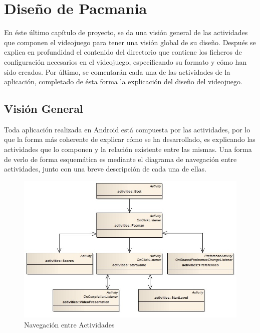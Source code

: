 \chapter{Diseño de Pacmania}

En éste último capítulo de proyecto, se da una visión general de las actividades que componen el videojuego para tener una visión global de su diseño. Después se explica en profundidad el contenido del directorio que contiene los ficheros de configuración necesarios en el videojuego, especificando su formato y cómo han sido creados. Por último, se comentarán cada una de las actividades de la aplicación, completado de ésta forma la explicación del diseño del videojuego.

\newpage

\section{Visión General}

Toda aplicación realizada en Android está compuesta por las actividades, por lo que la forma más coherente de explicar cómo se ha desarrollado, es explicando las actividades que lo componen y la relación existente entre las mismas. Una forma de verlo de forma esquemática es mediante el diagrama de navegación entre actividades, junto con una breve descripción de cada una de ellas.
\newline

\begin{figure}[h!]
	\centering
          \includegraphics[width=14cm]{img/screenshot/workflow.jpg}
	\caption{Navegación entre Actividades}
\end{figure}

